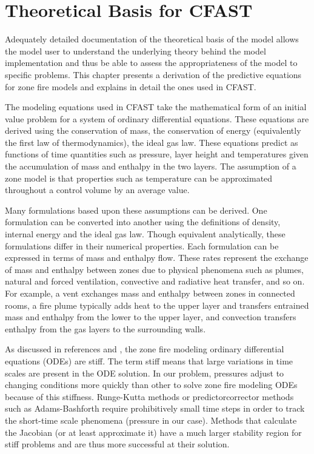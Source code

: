 \chapter{Theoretical Basis for CFAST}

Adequately detailed documentation of the theoretical basis of the model allows the model user to
understand the underlying theory behind the model implementation and thus be able to assess the
appropriateness of the model to specific problems. This chapter presents a derivation of the
predictive equations for zone fire models and explains in detail the ones used in CFAST.

The modeling equations used in CFAST take the mathematical form of an initial value problem
for a system of ordinary differential equations. These equations are derived using the
conservation of mass, the conservation of energy (equivalently the first law of thermodynamics),
the ideal gas law. These equations predict as functions of time quantities such as pressure, layer
height and temperatures given the accumulation of mass and enthalpy in the two layers. The
assumption of a zone model is that properties such as temperature can be approximated
throughout a control volume by an average value.

Many formulations based upon these assumptions can be derived. One formulation can be
converted into another using the definitions of density, internal energy and the ideal gas law.
Though equivalent analytically, these formulations differ in their numerical properties. Each
formulation can be expressed in terms of mass and enthalpy flow. These rates represent the
exchange of mass and enthalpy between zones due to physical phenomena such as plumes,
natural and forced ventilation, convective and radiative heat transfer, and so on. For example, a
vent exchanges mass and enthalpy between zones in connected rooms, a fire plume typically
adds heat to the upper layer and transfers entrained mass and enthalpy from the lower to the
upper layer, and convection transfers enthalpy from the gas layers to the surrounding walls.

As discussed in references \cite{Forney:1992} and \cite{Rehm:1992}, the zone fire modeling ordinary differential equations (ODEs) are stiff. The term stiff means that large variations in time scales are present in the ODE
solution. In our problem, pressures adjust to changing conditions more quickly than other
to solve zone fire modeling ODEs because of this stiffness. Runge-Kutta methods or predictorcorrector
methods such as Adams-Bashforth require prohibitively small time steps in order to
track the short-time scale phenomena (pressure in our case). Methods that calculate the Jacobian
(or at least approximate it) have a much larger stability region for stiff problems and are thus
more successful at their solution.


